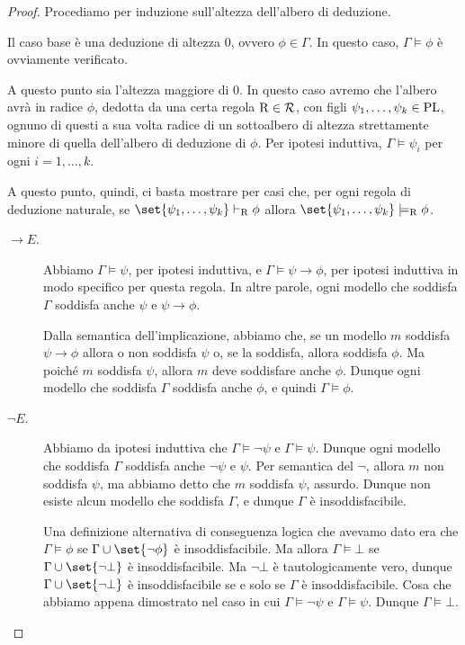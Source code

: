 \begin{proof}
  Procediamo per induzione sull'altezza dell'albero di deduzione.
  
  Il caso base è una deduzione di altezza \(0\), ovvero \(\phi \in \Gamma\). In questo caso, \(\Gamma\models\phi\) è ovviamente verificato.

  A questo punto sia l'altezza maggiore di \(0\). In questo caso avremo che l'albero avrà in radice \(\phi\), dedotta da una certa regola \(\operatorname{R} \in \mathcal{R}\), con figli \(\psi_1,\ldots,\psi_k \in \operatorname{PL}\), ognuno di questi a sua volta radice di un sottoalbero di altezza strettamente minore di quella dell'albero di deduzione di \(\phi\). Per ipotesi induttiva, \(\Gamma\models\psi_i\) per ogni \(i=1,\ldots,k\).

  A questo punto, quindi, ci basta mostrare per casi che, per ogni regola di deduzione naturale, se \(\set{\psi_1,\ldots,\psi_k} \vdash_{\Rule} \phi\) allora \(\set{\psi_1,\ldots,\psi_k} \models_{\Rule} \phi\).

  \begin{description}
    \item[\(\to E\).] Abbiamo \(\Gamma\models\psi\), per ipotesi induttiva, e \(\Gamma\models\psi\to\phi\), per ipotesi induttiva in modo specifico per questa regola.
    In altre parole, ogni modello che soddisfa \(\Gamma\) soddisfa anche \(\psi\) e \(\psi\to\phi\).
      
    Dalla semantica dell'implicazione, abbiamo che, se un modello \(m\) soddisfa \(\psi\to\phi\) allora o non soddisfa \(\psi\) o, se la soddisfa, allora soddisfa \(\phi\). Ma poiché \(m\) soddisfa \(\psi\), allora \(m\) deve soddisfare anche \(\phi\). Dunque ogni modello che soddisfa \(\Gamma\) soddisfa anche \(\phi\), e quindi \(\Gamma\models\phi\).
    \item[\(\neg E\).] Abbiamo da ipotesi induttiva che \(\Gamma\models\neg\psi\) e \(\Gamma\models\psi\). Dunque ogni modello che soddisfa \(\Gamma\) soddisfa anche \(\neg\psi\) e \(\psi\). Per semantica del \(\neg\), allora \(m\) non soddisfa \(\psi\), ma abbiamo detto che \(m\) soddisfa \(\psi\), assurdo. Dunque non esiste alcun modello che soddisfa \(\Gamma\), e dunque \(\Gamma\) è insoddisfacibile.

    Una definizione alternativa di conseguenza logica che avevamo dato era che \(\Gamma\models\phi\) se \(\Gamma\cup\set{\neg\phi}\) è insoddisfacibile. Ma allora \(\Gamma\models\bot\) se \(\Gamma\cup\set{\neg \bot}\) è insoddisfacibile. Ma \(\neg\bot\) è tautologicamente vero, dunque \(\Gamma\cup\set{\neg \bot}\) è insoddisfacibile se e solo se \(\Gamma\) è insoddisfacibile. Cosa che abbiamo appena dimostrato nel caso in cui \(\Gamma\models\neg\psi\) e \(\Gamma\models\psi\). Dunque \(\Gamma\models\bot\).


\end{description}
\end{proof}
